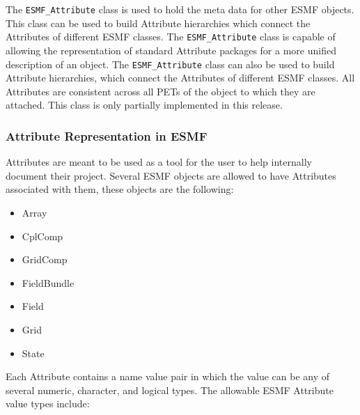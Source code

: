 %

The {\tt ESMF\_Attribute} class is used to hold the meta data for other ESMF objects.  This class can be used to build Attribute hierarchies which connect the Attributes of different ESMF classes.  The {\tt ESMF\_Attribute} class is capable of allowing the representation of standard Attribute packages for a more unified description of an object.  The {\tt ESMF\_Attribute} class can also be used to build Attribute hierarchies, which connect the Attributes of different ESMF classes.  All Attributes are consistent across all PETs of the object to which they are attached.  This class is only partially implemented in this release.

\subsubsection{Attribute Representation in ESMF}

Attributes are meant to be used as a tool for the user to help internally document their project.   Several ESMF objects are allowed to have Attributes associated with them, these objects are the following:

\begin{itemize}
\item Array
\item CplComp
\item GridComp
\item FieldBundle
\item Field
\item Grid
\item State
\end{itemize}

Each Attribute contains a name value pair in which the value can be any of several numeric, character, and logical types.  The allowable ESMF Attribute value types include:


